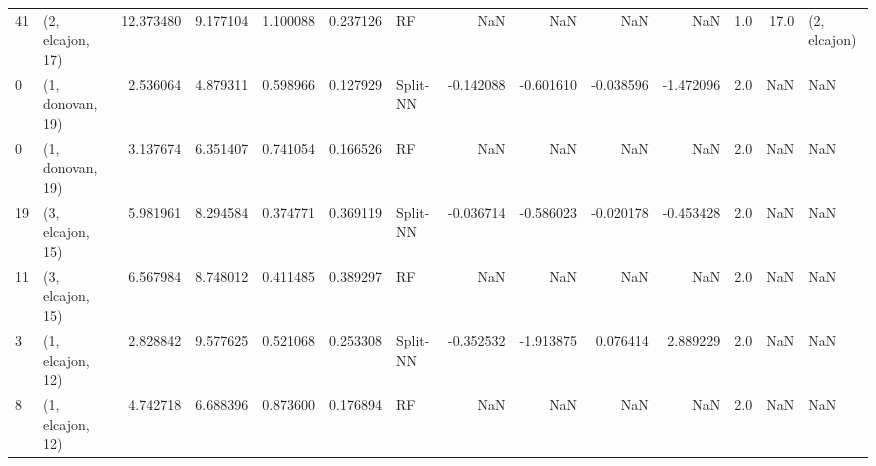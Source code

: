 \begin{tabular}{llrrrrlrrrrrrl}
41 &  (2, elcajon, 17) &  12.373480 &   9.177104 &   1.100088 &  0.237126 &          RF &             NaN &           NaN &            NaN &          NaN &            1.0 &   17.0 &     (2, elcajon) \\
0  &  (1, donovan, 19) &   2.536064 &   4.879311 &   0.598966 &  0.127929 &    Split-NN &       -0.142088 &     -0.601610 &      -0.038596 &    -1.472096 &            2.0 &    NaN &              NaN \\
0  &  (1, donovan, 19) &   3.137674 &   6.351407 &   0.741054 &  0.166526 &          RF &             NaN &           NaN &            NaN &          NaN &            2.0 &    NaN &              NaN \\
19 &  (3, elcajon, 15) &   5.981961 &   8.294584 &   0.374771 &  0.369119 &    Split-NN &       -0.036714 &     -0.586023 &      -0.020178 &    -0.453428 &            2.0 &    NaN &              NaN \\
11 &  (3, elcajon, 15) &   6.567984 &   8.748012 &   0.411485 &  0.389297 &          RF &             NaN &           NaN &            NaN &          NaN &            2.0 &    NaN &              NaN \\
3  &  (1, elcajon, 12) &   2.828842 &   9.577625 &   0.521068 &  0.253308 &    Split-NN &       -0.352532 &     -1.913875 &       0.076414 &     2.889229 &            2.0 &    NaN &              NaN \\
8  &  (1, elcajon, 12) &   4.742718 &   6.688396 &   0.873600 &  0.176894 &          RF &             NaN &           NaN &            NaN &          NaN &            2.0 &    NaN &              NaN \\
\bottomrule
\end{tabular}
